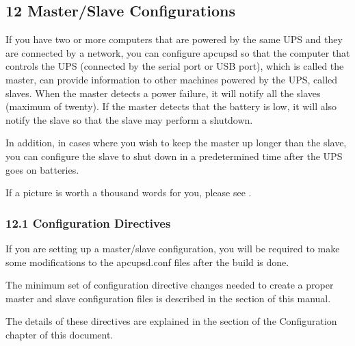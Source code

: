 {{{{{{{{{\label{Master_002fSlave-Configurations}

\subsection*{12 Master/Slave Configurations}

\label{index-Master_002fSlave-152}
If you have two or more computers that are powered by the same UPS and they
are connected by a network, you can configure apcupsd so that the computer
that controls the UPS (connected by the serial port or USB port), which is
called the master, can provide information to other machines powered by the
UPS, called slaves. When the master detects a power failure, it will notify
all the slaves (maximum of twenty). If the master detects that the battery is
low, it will also notify the slave so that the slave may perform a shutdown.  

In addition, in cases where you wish to keep the master up longer than the
slave, you can configure the slave to shut down in a predetermined time after
the UPS goes on batteries.  

If a picture is worth a thousand words for you, please see 
. 

\label{Configuration-Directives}

\subsubsection*{12.1 Configuration Directives}

\label{index-Directives-153}
\label{index-Configuration_002c-Directives-154}
If you are setting up a master/slave configuration, you will be required to
make some modifications to the apcupsd.conf files after the build is done.  

The minimum set of configuration directive changes needed to create a proper
master and slave configuration files is described in the 
 section of
this manual.  

The details of these directives are explained in the 
 section of the
Configuration chapter of this document.  

}}}}}}}}}
